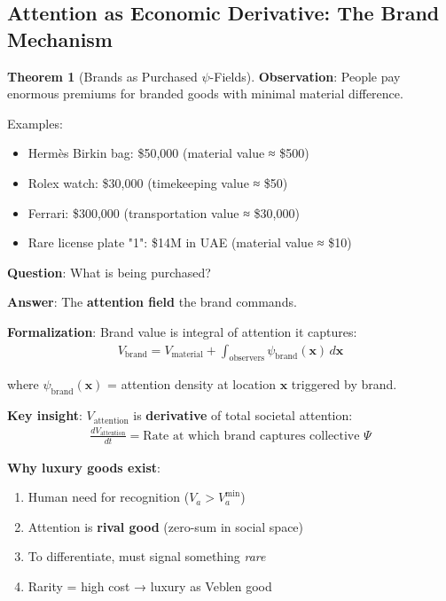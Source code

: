 \documentclass[11pt,a4paper]{article}
\theoremstyle{definition}
\newtheorem{theorem}{Theorem}[section]
\theoremstyle{remark}
\begin{document}
\begin{small}
\begin{enumerate}
\subsection{Attention as Economic Derivative: The Brand Mechanism}

\begin{theorem}[Brands as Purchased \(\psi\)-Fields]
\textbf{Observation}: People pay enormous premiums for branded goods with minimal material difference.

Examples:
\begin{itemize}
    \item Hermès Birkin bag: \$50,000 (material value ≈ \$500)
    \item Rolex watch: \$30,000 (timekeeping value ≈ \$50)
    \item Ferrari: \$300,000 (transportation value ≈ \$30,000)
    \item Rare license plate "1": \$14M in UAE (material value ≈ \$10)
\end{itemize}

\textbf{Question}: What is being purchased?

\textbf{Answer}: The \textbf{attention field} the brand commands.

\textbf{Formalization}: Brand value is integral of attention it captures:
\begin{align}
V_{\text{brand}} = V_{\text{material}} + \int_{\text{observers}} \psi_{\text{brand}}(\mathbf{x}) \, d\mathbf{x}
\end{align}

where \(\psi_{\text{brand}}(\mathbf{x})\) = attention density at location \(\mathbf{x}\) triggered by brand.

\textbf{Key insight}: \(V_{\text{attention}}\) is \textbf{derivative} of total societal attention:
\begin{align}
\frac{dV_{\text{attention}}}{dt} = \text{Rate at which brand captures collective } \Psi
\end{align}

\textbf{Why luxury goods exist}:
\begin{enumerate}
    \item Human need for recognition (\(V_a > V_a^{\min}\))
    \item Attention is \textbf{rival good} (zero-sum in social space)
    \item To differentiate, must signal something \textit{rare}
    \item Rarity = high cost → luxury as Veblen good
\end{enumerate}


\end{theorem}
\end{enumerate}
\end{small}
\end{document}

